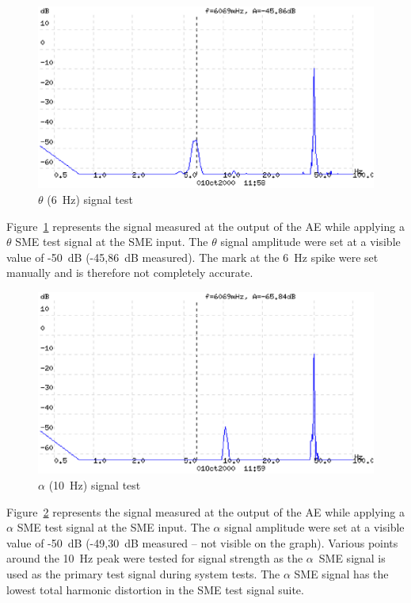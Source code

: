 \begin{figure}[htbp]
\begin{center}
	\includegraphics[width=\textwidth]{AE36SME.ps}
	\caption{$\theta$ (6~Hz) signal test}
	\label{fig:ae-sme6}
\end{center}
\end{figure}

Figure~\ref{fig:ae-sme6} represents the signal measured at the output
of the AE while applying a $\theta$ SME test signal at the SME
input. The $\theta$ signal amplitude were set at a visible value of
-50~dB (-45,86~dB measured). The mark at the 6~Hz spike were set
manually and is therefore not completely accurate.

\begin{figure}[htbp]
\begin{center}
	\includegraphics[width=\textwidth]{AE410SME.ps}
	\caption{$\alpha$ (10~Hz) signal test}
	\label{fig:ae-sme10}
\end{center}
\end{figure}

Figure~\ref{fig:ae-sme10} represents the signal measured at the output
of the AE while applying a $\alpha$ SME test signal at the SME
input. The $\alpha$ signal amplitude were set at a visible value of
-50~dB (-49,30~dB measured -- not visible on the graph). Various
points around the 10~Hz peak were tested for signal strength as the
$\alpha$~SME signal is used as the primary test signal during system
tests. The $\alpha$ SME signal has the lowest total harmonic
distortion in the SME test signal suite.


